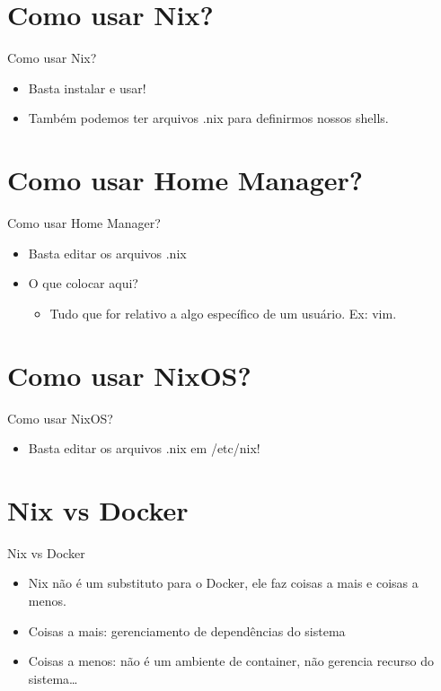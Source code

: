 \documentclass[presentation]{beamer}
\begin{document}
\section{Como usar Nix?}
\label{sec:org64c53cb}

\begin{frame}[label={sec:org4413226}]{Como usar Nix?}
\begin{itemize}
\item Basta instalar e usar!
\item Também podemos ter arquivos .nix para definirmos nossos shells.
\end{itemize}
\end{frame}

\section{Como usar Home Manager?}
\label{sec:org7bab2b0}

\begin{frame}[label={sec:orgc1a0a1c}]{Como usar Home Manager?}
\begin{itemize}
\item Basta editar os arquivos .nix
\item O que colocar aqui?
\begin{itemize}
\item Tudo que for relativo a algo específico de um usuário. Ex: vim.
\end{itemize}
\end{itemize}
\end{frame}

\section{Como usar NixOS?}
\label{sec:org543318b}

\begin{frame}[label={sec:org3ca2df8}]{Como usar NixOS?}
\begin{itemize}
\item Basta editar os arquivos .nix em /etc/nix!
\end{itemize}
\end{frame}

\section{Nix vs Docker}
\label{sec:org277f354}
\begin{frame}[label={sec:org4530758}]{Nix vs Docker}
\begin{itemize}
\item Nix não é um substituto para o Docker, ele faz coisas a mais e coisas a menos.
\item Coisas a mais: gerenciamento de dependências do sistema
\item Coisas a menos: não é um ambiente de container, não gerencia recurso do sistema\ldots{}
\end{itemize}
\end{frame}
\end{document}
